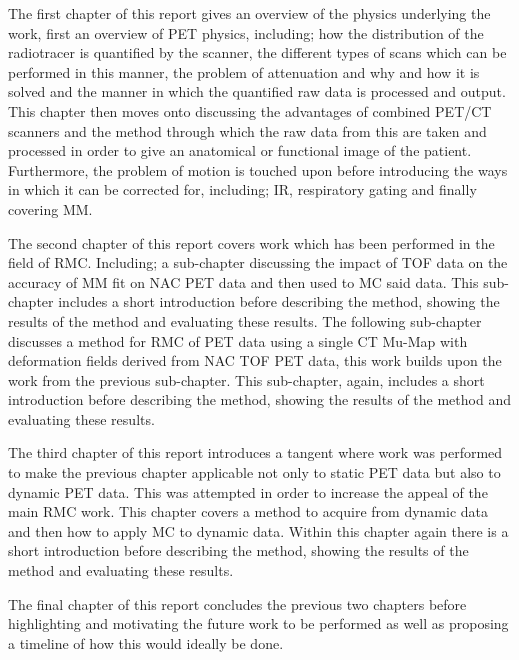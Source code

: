         The first chapter of this report gives an overview of the physics underlying the work, first an overview of \gls{PET} physics, including; how the distribution of the radiotracer is quantified by the scanner, the different types of scans which can be performed in this manner, the problem of attenuation and why and how it is solved and the manner in which the quantified raw data is processed and output. This chapter then moves onto discussing the advantages of combined \gls{PET}/\gls{CT} scanners and the method through which the raw data from this are taken and processed in order to give an anatomical or functional image of the patient. Furthermore, the problem of motion is touched upon before introducing the ways in which it can be corrected for, including; \gls{IR}, respiratory gating and finally covering \gls{MM}.
        
        The second chapter of this report covers work which has been performed in the field of \gls{RMC}. Including; a sub-chapter discussing the impact of \gls{TOF} data on the accuracy of \gls{MM} fit on \gls{NAC} \gls{PET} data and then used to \gls{MC} said data. This sub-chapter includes a short introduction before describing the method, showing the results of the method and evaluating these results. The following sub-chapter discusses a method for \gls{RMC} of \gls{PET} data using a single \gls{CT} \gls{Mu-Map} with deformation fields derived from \gls{NAC} \gls{TOF} \gls{PET} data, this work builds upon the work from the previous sub-chapter. This sub-chapter, again, includes a short introduction before describing the method, showing the results of the method and evaluating these results.
        
        The third chapter of this report introduces a tangent where work was performed to make the previous chapter applicable not only to static \gls{PET} data but also to dynamic \gls{PET} data. This was attempted in order to increase the appeal of the main \gls{RMC} work. This chapter covers a method to acquire  from dynamic data and then how to apply \gls{MC} to dynamic data. Within this chapter again there is a short introduction before describing the method, showing the results of the method and evaluating these results.
        
        The final chapter of this report concludes the previous two chapters before highlighting and motivating the future work to be performed as well as proposing a timeline of how this would ideally be done.
